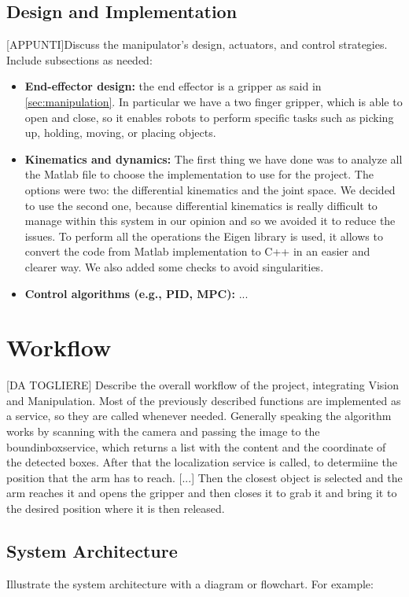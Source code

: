\documentclass[12pt,a4paper]{article}
\begin{document}
\subsection{Design and Implementation}\label{subsec:design}
[APPUNTI]Discuss the manipulator's design, actuators, and control strategies. Include subsections as needed:
\begin{itemize}
    \item \textbf{End-effector design:} the end effector is a gripper as said in \ref{sec:manipulation}. In particular we have a two finger gripper, which is able to open and close, so it enables robots to perform specific tasks such as picking up, holding, moving, or placing objects. 
    \item \textbf{Kinematics and dynamics:} The first thing we have done was to analyze all the Matlab file to choose the implementation to use for the project. The options were two: the differential kinematics and the joint space. We decided to use the second one, because differential kinematics is really difficult to manage within this system in our opinion and so we avoided it to reduce the issues. To perform all the operations the Eigen library is used, it allows to convert the code from Matlab implementation to C++ in an easier and clearer way. We also added some checks to avoid singularities. 
    \item \textbf{Control algorithms (e.g., PID, MPC):} ...
\end{itemize}



\section{Workflow}\label{sec:workflow}
[DA TOGLIERE]
Describe the overall workflow of the project, integrating Vision and Manipulation. Most of the previously described functions are implemented as a service, so they are called whenever needed. Generally speaking the algorithm works by scanning with the camera and passing the image to the boundinboxservice, which returns a list with the content and the coordinate of the detected boxes. After that the localization service is called, to determiine the position that the arm has to reach. [...] Then the closest object is selected and the arm reaches it and opens the gripper and then closes it to grab it and bring it to the desired position where it is then released.


\subsection{System Architecture}\label{subsec:systemarchitecture}
Illustrate the system architecture with a diagram or flowchart. For example:
\end{document}
